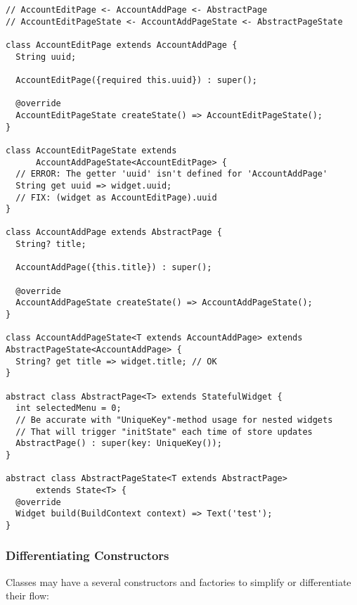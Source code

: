 \begin{lstlisting}
// AccountEditPage <- AccountAddPage <- AbstractPage
// AccountEditPageState <- AccountAddPageState <- AbstractPageState

class AccountEditPage extends AccountAddPage {
  String uuid;

  AccountEditPage({required this.uuid}) : super();

  @override
  AccountEditPageState createState() => AccountEditPageState();
}

class AccountEditPageState extends 
      AccountAddPageState<AccountEditPage> {
  // ERROR: The getter 'uuid' isn't defined for 'AccountAddPage'
  String get uuid => widget.uuid; 
  // FIX: (widget as AccountEditPage).uuid
}

class AccountAddPage extends AbstractPage {
  String? title;

  AccountAddPage({this.title}) : super();

  @override
  AccountAddPageState createState() => AccountAddPageState();
}

class AccountAddPageState<T extends AccountAddPage> extends AbstractPageState<AccountAddPage> {
  String? get title => widget.title; // OK
}

abstract class AbstractPage<T> extends StatefulWidget {
  int selectedMenu = 0;
  // Be accurate with "UniqueKey"-method usage for nested widgets
  // That will trigger "initState" each time of store updates 
  AbstractPage() : super(key: UniqueKey());
}

abstract class AbstractPageState<T extends AbstractPage> 
      extends State<T> {
  @override
  Widget build(BuildContext context) => Text('test');
}
\end{lstlisting}


\subsubsection{Differentiating Constructors}

Classes may have a several constructors and factories to simplify or differentiate their flow:

